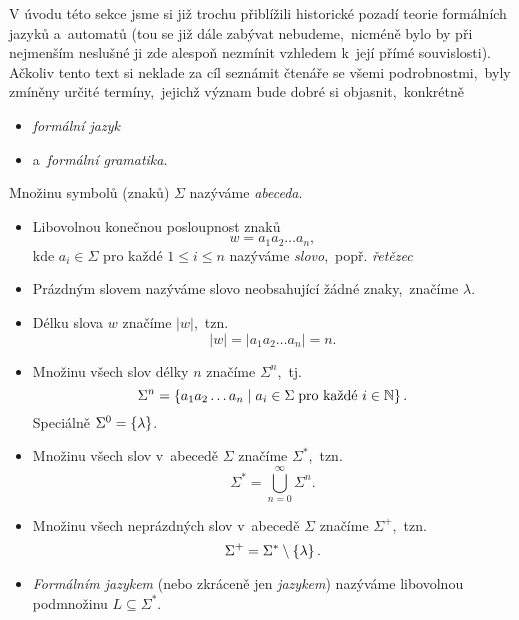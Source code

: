 V úvodu této sekce jsme si již trochu přiblížili historické pozadí teorie formálních jazyků a~automatů (tou se již dále zabývat nebudeme,~nicméně bylo by při nejmenším neslušné ji zde alespoň nezmínit vzhledem k~její přímé souvislosti). Ačkoliv tento text si neklade za cíl seznámit čtenáře se všemi podrobnostmi,~byly zmíněny určité termíny,~jejichž význam bude dobré si objasnit,~konkrétně
\begin{itemize}
    \item \emph{formální jazyk}
    \item a~\emph{formální gramatika}.
\end{itemize}
\begin{definition}\label{def:formalni-jazyk-etc}
    Množinu symbolů (znaků) $\Sigma$ nazýváme \emph{abeceda}.
    \begin{itemize}
        \item Libovolnou konečnou posloupnost znaků
        \[w=a_1a_2\ldots a_n,\]
        kde $a_i\in\Sigma$ pro každé $1\leqslant i\leqslant n$ nazýváme \emph{slovo},~popř. \emph{řetězec}
        \item Prázdným slovem nazýváme slovo neobsahující žádné znaky,~značíme $\lambda$.
        \item Délku slova $w$ značíme $|w|$,~tzn.
        \[|w|=|a_1a_2\ldots a_n|=n.\]
        \item Množinu všech slov délky $n$ značíme $\Sigma^n$,~tj.
        \[\Sigma^n=\left\{a_1a_2\ldots a_n\mid a_i\in\Sigma\;\text{pro každé $i\in\mathbb{N}$}\right\}.\]
        Speciálně $\Sigma^0=\left\{\lambda\right\}$.
        \item Množinu všech slov v~abecedě $\Sigma$ značíme $\Sigma^*$,~tzn.
        \[\Sigma^*=\bigcup_{n=0}^\infty\Sigma^n.\]
        \item Množinu všech neprázdných slov v~abecedě $\Sigma$ značíme $\Sigma^+$,~tzn.
        \[\Sigma^+=\Sigma^*\setminus\left\{\lambda\right\}.\]
        \item \emph{Formálním jazykem} (nebo zkráceně jen \emph{jazykem}) nazýváme libovolnou podmnožinu $L\subseteq\Sigma^*$.
    \end{itemize}
\end{definition}
